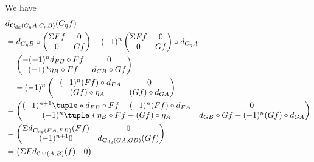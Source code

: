 \begin{remark}
\begin{itemize}
{            We have
            \begin{align*}
                &d_{\C_{\dg}(C_{\eta} A, C_{\eta} B)}(C_{\eta} f) \\
                &= d_{C_{\eta} B} \circ
                \begin{pmatrix}
                    \Sigma F f & 0 \\
                    0 & G f
                \end{pmatrix}
                - (-1)^n
                \begin{pmatrix}
                    \Sigma F f & 0 \\
                    0 & G f
                \end{pmatrix}
                \circ d_{C_{\eta} A} \\
                &=
                \begin{pmatrix}
                    -(-1)^n d_{F B} \circ F f & 0 \\
                    (-1)^n \eta_B \circ F f & d_{G B} \circ G f
                \end{pmatrix} \\
                &\hspace{0.4cm} - (-1)^n
                \begin{pmatrix}
                    -(-1)^n (F f) \circ d_{F A} & 0 \\
                    (G f) \circ \eta_A & (G f) \circ d_{G A}
                \end{pmatrix} \\
                &=
                \begin{pmatrix}
                    (-1)^{n + 1}\tuple*{d_{F B} \circ F f - (-1)^n (F f) \circ d_{F A}} & 0 \\
                    (-1)^n\tuple*{\eta_B \circ F f - (G f) \circ \eta_A} & d_{G B} \circ G f - (-1)^n (G f) \circ d_{G A}
                \end{pmatrix} \\
                &=
                \begin{pmatrix}
                    \Sigma d_{\C_{\dg}(F A, F B)}(F f) & 0 \\
                    (-1)^{n + 1} 0 & d_{\C_{\dg}(G A, G B)}(G f)
                \end{pmatrix} \\
                &=
                \begin{pmatrix}
                    \Sigma F d_{\Cc^{\op}(A, B)}(f) & 0 \\

\end{pmatrix}
\end{align*}}
\end{itemize}
\end{remark}
